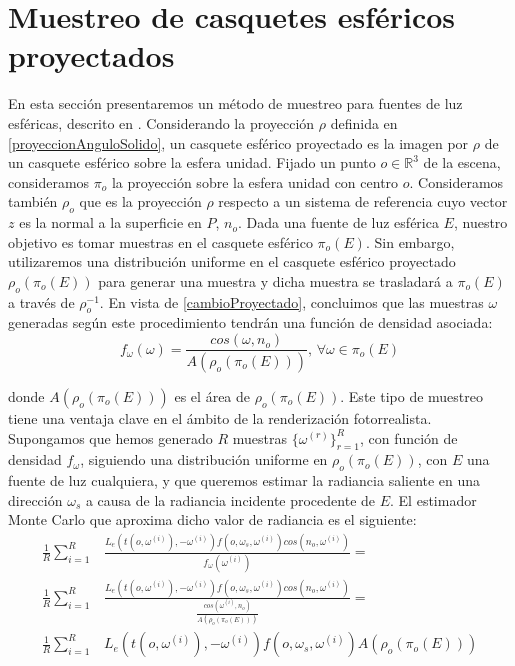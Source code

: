 \section{Muestreo de casquetes esféricos proyectados}

En esta sección presentaremos un método de muestreo para fuentes de luz esféricas, descrito en \cite{Urena2018}. Considerando la proyección $\rho$ definida en \ref{proyeccionAnguloSolido}, un casquete esférico proyectado es la imagen por $\rho$ de un casquete esférico sobre la esfera unidad. Fijado un punto $o\in\mathds{R}^3$ de la escena, consideramos $\pi_o$ la proyección sobre la esfera unidad con centro $o$. Consideramos también $\rho_o$ que es la proyección $\rho$ respecto a un sistema de referencia cuyo vector $z$ es la normal a la superficie en $P$, $n_o$. Dada una fuente de luz esférica $E$, nuestro objetivo es tomar muestras en el casquete esférico $\pi_o(E)$. Sin embargo, utilizaremos una distribución uniforme en el casquete esférico proyectado $\rho_o(\pi_o(E))$ para generar una muestra y dicha muestra se trasladará a $\pi_o(E)$ a través de $\rho_o^{-1}$. En vista de \ref{cambioProyectado}, concluimos que las muestras $\omega$ generadas según este procedimiento tendrán una función de densidad asociada:
$$f_{\omega}(\omega) = \frac{cos(\omega , n_o)}{A(\rho_o(\pi_o(E)))}\text{, }\forall \omega\in\pi_o(E)$$

donde $A(\rho_o(\pi_o(E)))$ es el área de $\rho_o(\pi_o(E))$. Este tipo de muestreo tiene una ventaja clave en el ámbito de la renderización fotorrealista. Supongamos que hemos generado $R$ muestras $\{\omega^{(r)}\}_{r=1}^R$, con función de densidad $f_{\omega}$, siguiendo una distribución uniforme en $\rho_o(\pi_o(E))$, con $E$ una fuente de luz cualquiera, y que queremos estimar la radiancia saliente en una dirección $\omega_s$ a causa de la radiancia incidente procedente de $E$. El estimador Monte Carlo que aproxima dicho valor de radiancia es el siguiente:
\begin{align*}
\frac{1}{R}\sum_{i=1}^R&\frac{L_e(t(o,\omega^{(i)}),-\omega^{(i)}) f(o,\omega_s,\omega^{(i)}) cos(n_o,\omega^{(i)}) }{f_{\omega}(\omega^{(i)})} = \\
\frac{1}{R}\sum_{i=1}^R&\frac{L_e(t(o,\omega^{(i)}),-\omega^{(i)}) f(o,\omega_s,\omega^{(i)}) cos(n_o,\omega^{(i)}) }{\frac{cos(\omega^{(i)} , n_o)}{A(\rho_o(\pi_o(E)))}} = \\
\frac{1}{R}\sum_{i=1}^R&L_e(t(o,\omega^{(i)}),-\omega^{(i)}) f(o,\omega_s,\omega^{(i)})  A(\rho_o(\pi_o(E)))
\end{align*}

